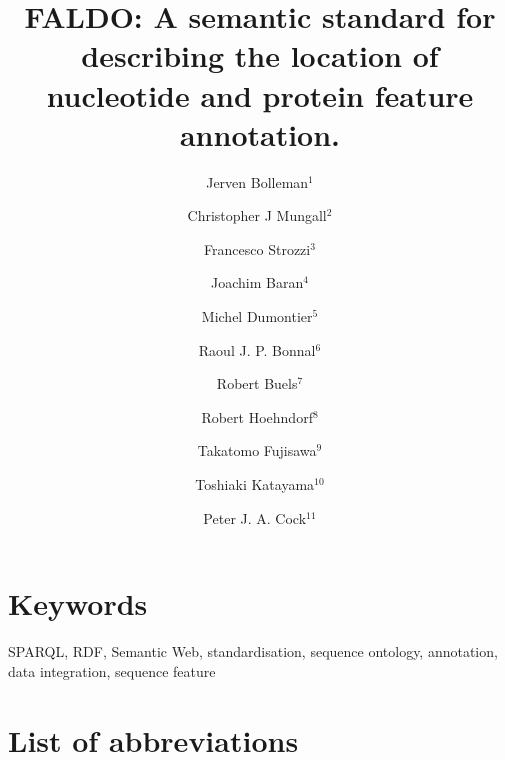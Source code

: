 \documentclass[10pt]{bmc_article}
\newenvironment{bmcformat}{\begin{raggedright}\baselineskip20pt\sloppy\setboolean{publ}{false}}{\end{raggedright}\baselineskip20pt\sloppy}
\begin{document}
\begin{bmcformat}
\title{FALDO: A semantic standard for describing the location of nucleotide and protein feature annotation.}
\author{Jerven Bolleman\correspondingauthor$^{1}$%
    \and Christopher J Mungall$^{2}$%
    \and Francesco Strozzi$^{3}$%
    \and Joachim Baran$^{4}$%
    \and Michel Dumontier$^{5}$%
    \and Raoul J. P. Bonnal$^{6}$%
    \and Robert Buels$^{7}$%
    \and Robert Hoehndorf$^{8}$%
    \and Takatomo Fujisawa$^{9}$%
    \and Toshiaki Katayama$^{10}$%
    \and Peter J. A. Cock$^{11}$%
%
}
\address{
 \iid(1) Swiss-Prot group, SIB Swiss Institute of Bioinformatics, Centre Medical Universitaire, 1 rue Michel
Servet, 1211 Geneva 4, Switzerland,
 \iid(2) Genomics Division, Lawrence Berkeley National Laboratory, Berkeley, CA, 94720, US,
 \iid(3) CeRSA, Parco Tecnologico Padano, Lodi 26900, Italy,
 \iid(4) Ontario Institute for Cancer Research, 101 College Street, Suite 800, Toronto, Ontario, M5G 0A3, Canada,
 \iid(5) Stanford Center for Biomedical Informatics Research, 1265 Welch Road, Room X223, Stanford, CA, 94305-5479, US,
 \iid(6) Integrative Biology Program, Istituto Nazionale Genetica Molecolare, Milan, Italy,
 \iid(7) University of California, Berkeley, Berkeley, CA, USA,
 \iid(8) Department of Computer Science, Aberystwyth, SY23 3DB, UK,
 \iid(9) Center for Information Biology, National Institute of Genetics, Research Organization of Information and Systems, 1111 Yata, Mishima, Shizuoka 411-08540, Japan,
 \iid(10) Database Center for Life Science, Research Organization of Information and Systems, 2-11-16, Yayoi, Bunkyo-ku, Tokyo, 113-0032, Japan, and
 \iid(11) The James Hutton Institute, Dundee, DD2 5DA, UK.
}
\maketitle


\section*{Keywords}
SPARQL, RDF, Semantic Web, standardisation, sequence ontology, annotation, data integration, sequence feature









\section*{List of abbreviations}


\end{bmcformat}
\end{document}
